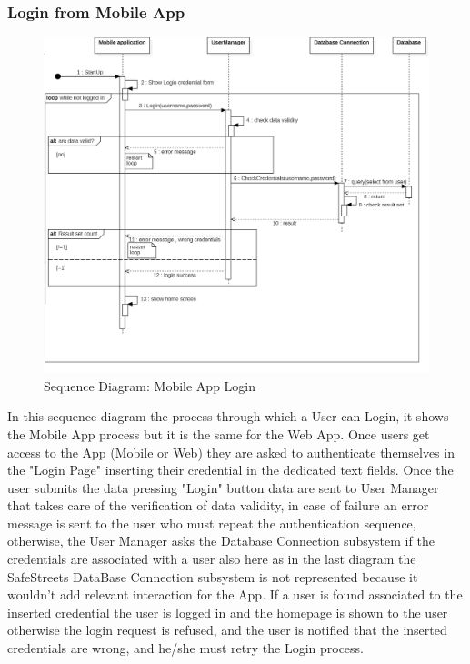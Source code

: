 \subsubsection{Login from Mobile App}
\begin{figure}[H]
\centering
\includegraphics[width=\textwidth]{Images/SequenceLogin.png}
\caption{\label{fig:ComWI}Sequence Diagram: Mobile App Login}
\end{figure}
In this sequence diagram the process through which a User can Login, it shows the Mobile App process
but it is the same for the Web App. Once users get access to the App (Mobile or Web) they are asked
to authenticate themselves in the "Login Page" inserting their credential in the dedicated text fields. Once
the user submits the data pressing "Login" button data are sent to User Manager that takes care of the
verification of data validity, in case of failure an error message is sent to the user who must repeat the
authentication sequence, otherwise, the User Manager asks the Database Connection subsystem if the credentials are associated with a user also here as in the last diagram the SafeStreets DataBase Connection
subsystem is not represented because it wouldn’t add relevant interaction for the App. If a user is found
associated to the inserted credential the user is logged in and the homepage is shown to the user otherwise
the login request is refused, and the user is notified that the inserted credentials are wrong, and he/she must retry the Login process.
